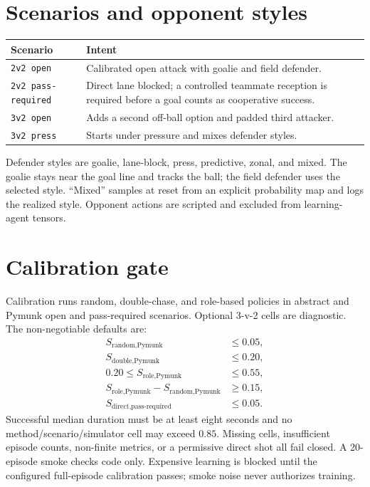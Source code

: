 \documentclass[12pt,twocolumn]{article}
\begin{document}
\section{Scenarios and opponent styles}
\scriptsize
\begin{tabular}{p{}p{}}
\toprule Scenario & Intent \\
\midrule
\texttt{2v2 open} & Calibrated open attack with goalie and field defender.\\
\texttt{2v2 pass-required} & Direct lane blocked; a controlled teammate reception is
required before a goal counts as cooperative success.\\
\texttt{3v2 open} & Adds a second off-ball option and padded third attacker.\\
\texttt{3v2 press} & Starts under pressure and mixes defender styles.\\
\bottomrule
\end{tabular}
\normalsize

Defender styles are goalie, lane-block, press, predictive, zonal, and mixed. The goalie stays near
the goal line and tracks the ball; the field defender uses the selected style. ``Mixed'' samples
at reset from an explicit probability map and logs the realized style. Opponent actions are
scripted and excluded from learning-agent tensors.

\section{Calibration gate}
Calibration runs random, double-chase, and role-based policies in abstract and Pymunk open and
pass-required scenarios. Optional 3-v-2 cells are diagnostic. The non-negotiable defaults are:
\begin{align*}
S_{\text{random,Pymunk}}&\leq0.05,\\
S_{\text{double,Pymunk}}&\leq0.20,\\
0.20\leq S_{\text{role,Pymunk}}&\leq0.55,\\
S_{\text{role,Pymunk}}-S_{\text{random,Pymunk}}&\geq0.15,\\
S_{\text{direct,pass-required}}&\leq0.05.
\end{align*}
Successful median duration must be at least eight seconds and no method/scenario/simulator cell may
exceed $0.85$. Missing cells, insufficient episode counts, non-finite metrics, or a permissive
direct shot all fail closed. A 20-episode smoke checks code only. Expensive learning is blocked
until the configured full-episode calibration passes; smoke noise never authorizes training.
\end{document}
